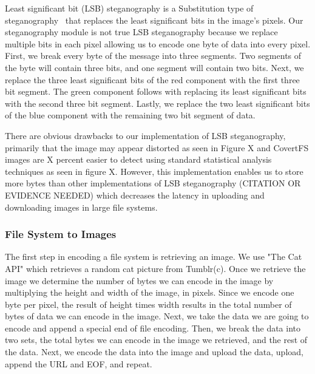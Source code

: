 Least significant bit (LSB) steganography is a Substitution type of steganography~\cite{Nosrati2011} that replaces the least significant bits in the image's pixels. Our steganography module is not true LSB steganography because we replace multiple bits in each pixel allowing us to encode one byte of data into every pixel. First, we break every byte of the message into three segments. Two segments of the byte will contain three bits, and one segment will contain two bits. Next, we replace the three least significant bits of the red component with the first three bit segment. The green component follows with replacing its least significant bits with the second three bit segment. Lastly, we replace the two least significant bits of the blue component with the remaining two bit segment of data. 

There are obvious drawbacks to our implementation of LSB steganography, primarily that the image may appear distorted as seen in Figure X and CovertFS images are X percent easier to detect using standard statistical analysis techniques as seen in figure X. However, this implementation enables us to store more bytes than other implementations of LSB steganography (CITATION OR EVIDENCE NEEDED) which decreases the latency in uploading and downloading images in large file systems.
 
\subsubsection{File System to Images}

The first step in encoding a file system is retrieving an image. We use "The Cat API" which retrieves a random cat picture from Tumblr(c). Once we retrieve the image we determine the number of bytes we can encode in the image by multiplying the height and width of the image, in pixels. Since we encode one byte per pixel, the result of height times width results in the total number of bytes of data we can encode in the image. Next, we take the data we are going to encode and append a special end of file encoding. Then, we break the data into two sets, the total bytes we can encode in the image we retrieved, and the rest of the data. Next, we encode the data into the image and upload the data, upload, append the URL and EOF, and repeat. 


